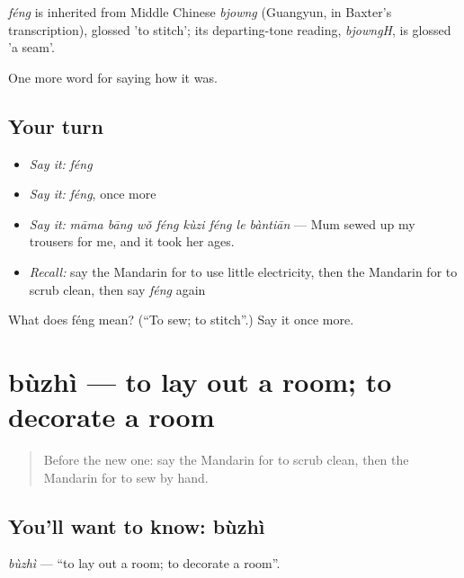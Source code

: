 \begin{cousinweb}
\emph{féng} is inherited from Middle Chinese \emph{bjowng} (Guangyun, in Baxter's transcription), glossed 'to stitch'; its departing-tone reading, \emph{bjowngH}, is glossed 'a seam'.
\end{cousinweb}

\begin{grammarlens}[title={What you've built}]
One more word for saying how it was.
\end{grammarlens}

\subsection*{Your turn}
\begin{itemize}
\raggedright
  \item \emph{Say it:} \emph{féng}
  \item \emph{Say it:} \emph{féng}, once more
  \item \emph{Say it:} \emph{māma bāng wǒ féng kùzi féng le bàntiān} — Mum sewed up my trousers for me, and it took her ages.
  \item \emph{Recall:} say the Mandarin for to use little electricity, then the Mandarin for to scrub clean, then say \emph{féng} again
\end{itemize}

\begin{tcolorbox}[breakable,colback=teal!4,colframe=teal!35!black,title={Before you move on}]
What does féng mean? (\textquotedblleft{}To sew; to stitch\textquotedblright{}.) Say it once more.
\end{tcolorbox}
\section[bùzhì]{bùzhì — to lay out a room; to decorate a room}

\label{lesson:ZH-C521-buzhi}



\begin{quote}
Before the new one: say the Mandarin for to scrub clean, then the Mandarin for to sew by hand.
\end{quote}

\subsection*{You'll want to know: bùzhì}
\emph{bùzhì} — \textquotedblleft{}to lay out a room; to decorate a room\textquotedblright{}.

